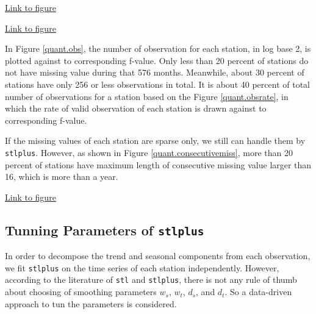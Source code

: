 \begin{framed}
\begin{center}
  \href{../plots/a1950/a1950.obs.station.pdf}{Link to figure}
  \label{quant.obs}
\end{center}
\end{framed}

\begin{framed}
\begin{center}
  \href{../plots/a1950/a1950.obsrate.station.pdf}{Link to figure}
  \label{quant.obsrate}
\end{center}
\end{framed}

In Figure \href{../plots/a1950/a1950.obs.station.pdf}{\ref*{quant.obs}}, the 
number of observation for each station, in log base 2, is plotted against to 
corresponding f-value. Only less than 20 percent of stations do not have missing
value during that 576 months. Meanwhile, about 30 percent of stations have only
256 or less observations in total. It is about 40 percent of total number of 
observations for a station based on the Figure 
\href{../plots/a1950/a1950.obsrate.station.pdf}{\ref*{quant.obsrate}}, in which 
the rate of valid observation of each station is drawn against to corresponding 
f-value.

If the missing values of each station are sparse only, we still can handle them 
by \texttt{stlplus}. However, as shown in Figure 
\href{../plots/a1950/a1950.consecutive.miss.station.pdf}{\ref*{quant.consecutivemiss}},
more than 20 percent of stations have maximum length of consecutive missing value 
larger than 16, which is more than a year. 


\begin{framed}
\begin{center}
  \href{../plots/a1950/a1950.consecutive.miss.station.pdf}{Link to figure}
  \label{quant.consecutivemiss}
\end{center}
\end{framed}


\subsection{Tunning Parameters of \texttt{stlplus}}

In order to decompose the trend and seasonal components from each observation, we 
fit \texttt{stlplus} on the time series of each station independently. However,
according to the literature of \texttt{stl} and \texttt{stlplus}, there is not 
any rule of thumb about choosing of smoothing parameters $w_s$, $w_t$, $d_s$, and 
$d_t$. So a data-driven approach to tun the parameters is considered. 

